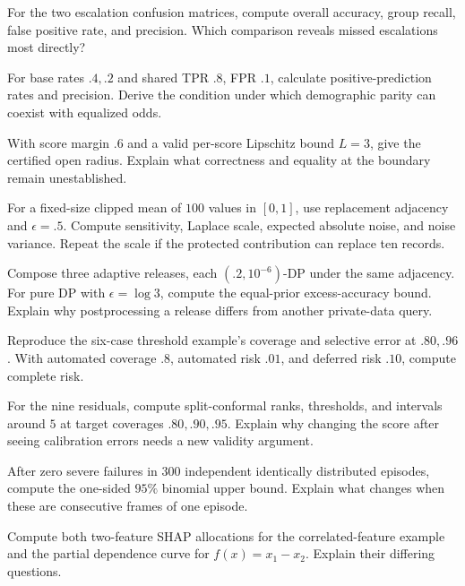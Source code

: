 \begin{exercises}
\item {}For the two escalation confusion matrices, compute overall accuracy, group recall, false positive rate, and precision. Which comparison reveals missed escalations most directly?
\item {}For base rates $.4,.2$ and shared TPR $.8$, FPR $.1$, calculate positive-prediction rates and precision. Derive the condition under which demographic parity can coexist with equalized odds.
\item {}With score margin $.6$ and a valid per-score Lipschitz bound $L=3$, give the certified open radius. Explain what correctness and equality at the boundary remain unestablished.
\item {}For a fixed-size clipped mean of $100$ values in $[0,1]$, use replacement adjacency and $\epsilon=.5$. Compute sensitivity, Laplace scale, expected absolute noise, and noise variance. Repeat the scale if the protected contribution can replace ten records.
\item {}Compose three adaptive releases, each $(.2,10^{-6})$-DP under the same adjacency. For pure DP with $\epsilon=\log 3$, compute the equal-prior excess-accuracy bound. Explain why postprocessing a release differs from another private-data query.
\item {}Reproduce the six-case threshold example's coverage and selective error at $.80,.96$. With automated coverage $.8$, automated risk $.01$, and deferred risk $.10$, compute complete risk.
\item {}For the nine residuals, compute split-conformal ranks, thresholds, and intervals around $5$ at target coverages $.80,.90,.95$. Explain why changing the score after seeing calibration errors needs a new validity argument.
\item {}After zero severe failures in $300$ independent identically distributed episodes, compute the one-sided $95\%$ binomial upper bound. Explain what changes when these are consecutive frames of one episode.
\item {}Compute both two-feature SHAP allocations for the correlated-feature example and the partial dependence curve for $f(x)=x_1-x_2$. Explain their differing questions.
\end{exercises}

